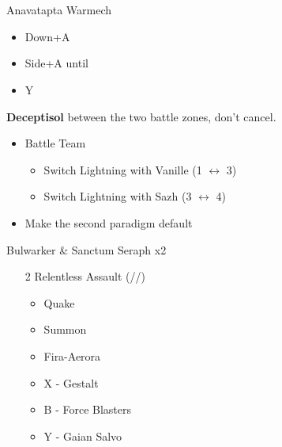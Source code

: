 \chapter{}

\begin{battle}{Anavatapta Warmech}
\begin{itemize}
    \item Down+A
    \item Side+A until \stagger
    \item Y
\end{itemize}
\end{battle}


\textbf{Deceptisol} between the two battle zones, don't cancel.

\begin{menu}
\begin{itemize}
    \paradigm
    \begin{itemize}
        \item Battle Team
        \begin{itemize}
            \item Switch Lightning with Vanille (1 $\leftrightarrow$ 3)
            \item Switch Lightning with Sazh (3 $\leftrightarrow$ 4)
        \end{itemize}
        \item Make the second paradigm default
    \end{itemize}
\end{itemize}
\end{menu}

\begin{battle}{Bulwarker \& Sanctum Seraph x2}
\begin{itemize}
    \item [2] Relentless Assault (\rav/\rav/\com)
    \begin{itemize}
        \item Quake
        \item Summon
        \item Fira-Aerora
        \item X - Gestalt
        \item B - Force Blasters
        \item Y - Gaian Salvo
    \end{itemize}
\end{itemize}
\end{battle}

